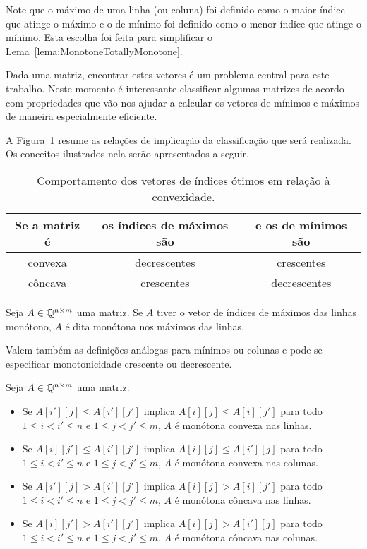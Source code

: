 Note que o máximo de uma linha (ou coluna) foi definido como o maior índice que atinge o máximo e o de mínimo foi definido como o menor índice que atinge o mínimo. Esta escolha foi feita para simplificar o Lema~\ref{lema:MonotoneTotallyMonotone}.  

Dada uma matriz, encontrar estes vetores é um problema central para este trabalho. Neste momento é interessante classificar algumas matrizes de acordo com propriedades que vão nos ajudar a calcular os vetores de mínimos e máximos de maneira especialmente eficiente.   

A Figura~\ref{table:ConvexMonotone} resume as relações de implicação da classificação que será realizada. Os conceitos ilustrados nela serão apresentados a seguir.

\begin{table}[t]
    \caption{Comportamento dos vetores de índices ótimos em relação à convexidade.} \label{table:ConvexMonotone}
    \begin{tabular}{ c | c | c }
        Se a matriz é & os índices de máximos são & e os de mínimos são \\
        \hline
        convexa       & decrescentes              & crescentes        \\
        \hline
        côncava       & crescentes                & decrescentes          \\
    \end{tabular}
\end{table}

\begin{defi}
Seja $A \in \mathbb{Q}^{n \times m}$ uma matriz. Se $A$ tiver o vetor de índices de máximos das linhas monótono, $A$ é dita monótona nos máximos das linhas. 

Valem também as definições análogas para mínimos ou colunas e pode-se especificar monotonicidade crescente ou decrescente.
\end{defi}

\begin{defi}
Seja $A \in \mathbb{Q}^{n \times m}$ uma matriz.
    \begin{itemize}
        \item Se $A[i'][j] \leq A[i'][j']$ implica $A[i][j] \leq A[i][j']$ para todo $1 \leq i < i' \leq n$ e $1 \leq j < j' \leq m$, $A$ é monótona convexa nas linhas.
        \item Se $A[i][j'] \leq A[i'][j']$ implica $A[i][j] \leq A[i'][j]$ para todo $1 \leq i < i' \leq n$ e $1 \leq j < j' \leq m$, $A$ é monótona convexa nas colunas.
        \item Se $A[i'][j] > A[i'][j']$ implica $A[i][j] > A[i][j']$ para todo $1 \leq i < i' \leq n$ e $1 \leq j < j' \leq m$, $A$ é monótona côncava nas linhas.
        \item Se $A[i][j'] > A[i'][j']$ implica $A[i][j] > A[i'][j]$ para todo $1 \leq i < i' \leq n$ e $1 \leq j < j' \leq m$, $A$ é monótona côncava nas colunas.
    \end{itemize}
\end{defi}

